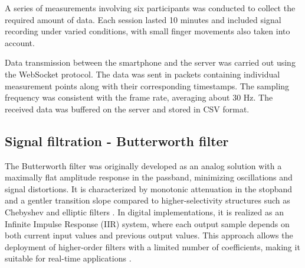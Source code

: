 \documentclass[journal]{IEEEtran}
\begin{document}
A series of measurements involving six participants was conducted to collect the required amount of data. Each session lasted 10 minutes and included signal recording under varied conditions, with small finger movements also taken into account.

Data transmission between the smartphone and the server was carried out using the WebSocket protocol. The data was sent in packets containing individual measurement points along with their corresponding timestamps. The sampling frequency was consistent with the frame rate, averaging about 30 Hz. The received data was buffered on the server and stored in CSV format.

\subsection{Signal filtration - Butterworth filter}
The Butterworth filter was originally developed as an analog solution with a maximally flat amplitude response in the passband, minimizing oscillations and signal distortions. It is characterized by monotonic attenuation in the stopband and a gentler transition slope compared to higher-selectivity structures such as Chebyshev and elliptic filters \cite{22}. In digital implementations, it is realized as an Infinite Impulse Response (IIR) system, where each output sample depends on both current input values and previous output values. This approach allows the deployment of higher-order filters with a limited number of coefficients, making it suitable for real-time applications \cite{23}.
\end{document}
